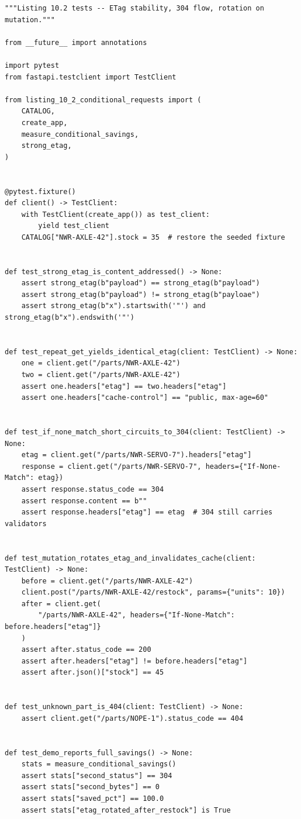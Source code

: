 \begin{verbatim}
"""Listing 10.2 tests -- ETag stability, 304 flow, rotation on mutation."""

from __future__ import annotations

import pytest
from fastapi.testclient import TestClient

from listing_10_2_conditional_requests import (
    CATALOG,
    create_app,
    measure_conditional_savings,
    strong_etag,
)


@pytest.fixture()
def client() -> TestClient:
    with TestClient(create_app()) as test_client:
        yield test_client
    CATALOG["NWR-AXLE-42"].stock = 35  # restore the seeded fixture


def test_strong_etag_is_content_addressed() -> None:
    assert strong_etag(b"payload") == strong_etag(b"payload")
    assert strong_etag(b"payload") != strong_etag(b"payloae")
    assert strong_etag(b"x").startswith('"') and strong_etag(b"x").endswith('"')


def test_repeat_get_yields_identical_etag(client: TestClient) -> None:
    one = client.get("/parts/NWR-AXLE-42")
    two = client.get("/parts/NWR-AXLE-42")
    assert one.headers["etag"] == two.headers["etag"]
    assert one.headers["cache-control"] == "public, max-age=60"


def test_if_none_match_short_circuits_to_304(client: TestClient) -> None:
    etag = client.get("/parts/NWR-SERVO-7").headers["etag"]
    response = client.get("/parts/NWR-SERVO-7", headers={"If-None-Match": etag})
    assert response.status_code == 304
    assert response.content == b""
    assert response.headers["etag"] == etag  # 304 still carries validators


def test_mutation_rotates_etag_and_invalidates_cache(client: TestClient) -> None:
    before = client.get("/parts/NWR-AXLE-42")
    client.post("/parts/NWR-AXLE-42/restock", params={"units": 10})
    after = client.get(
        "/parts/NWR-AXLE-42", headers={"If-None-Match": before.headers["etag"]}
    )
    assert after.status_code == 200
    assert after.headers["etag"] != before.headers["etag"]
    assert after.json()["stock"] == 45


def test_unknown_part_is_404(client: TestClient) -> None:
    assert client.get("/parts/NOPE-1").status_code == 404


def test_demo_reports_full_savings() -> None:
    stats = measure_conditional_savings()
    assert stats["second_status"] == 304
    assert stats["second_bytes"] == 0
    assert stats["saved_pct"] == 100.0
    assert stats["etag_rotated_after_restock"] is True
\end{verbatim}

